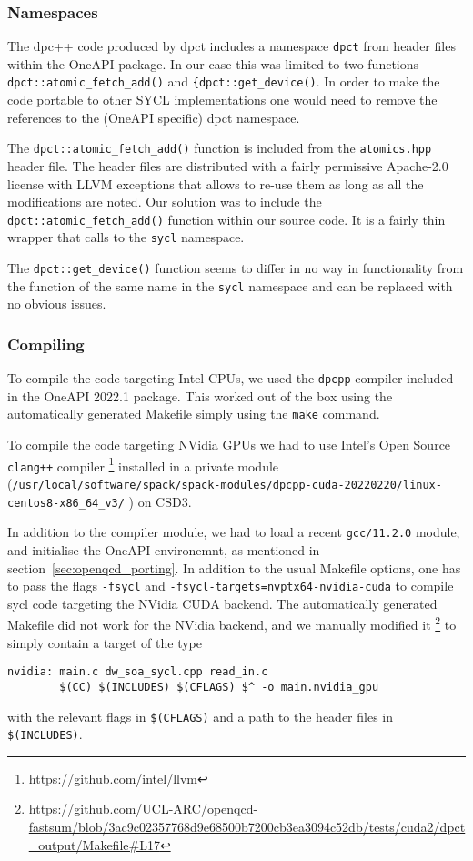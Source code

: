 \subsubsection{Namespaces}\label{sec:openqcd_namespaces}

The dpc++ code produced by dpct includes a namespace \texttt{dpct} from header files within the OneAPI package. In our case this was limited to two functions \verb!dpct::atomic_fetch_add()! and \verb!{dpct::get_device()!. In order to make the code portable to other SYCL implementations one would need to remove the references to the (OneAPI specific) dpct namespace.

The \verb!dpct::atomic_fetch_add()! function is included from the \texttt{atomics.hpp} header file. The header files are distributed with a fairly permissive Apache-2.0 license with LLVM exceptions that allows to re-use them as long as all the modifications are noted. Our solution was to include the \verb!dpct::atomic_fetch_add()! function within our source code. It is a fairly thin wrapper that calls to the \texttt{sycl} namespace.

The \verb!dpct::get_device()! function seems to differ in no way in functionality from the function of the same name in the \texttt{sycl} namespace and can be replaced with no obvious issues. 

\subsubsection{Compiling}\label{sec:openqcd_compiling}

To compile the code targeting Intel CPUs, we used the \texttt{dpcpp} compiler included in the OneAPI 2022.1 package. This worked out of the box using the automatically generated Makefile simply using the \texttt{make} command.

To compile the code targeting NVidia GPUs we had to use Intel's Open Source \verb #clang++# compiler \footnote{\url{https://github.com/intel/llvm}}
installed in a private module (\verb #/usr/local/software/spack/spack-modules/dpcpp-cuda-20220220/linux-centos8-x86_64_v3/# ) on CSD3.

In addition to the compiler module, we had to load a recent \verb #gcc/11.2.0# module, and initialise the OneAPI environemnt, as mentioned in section~\ref{sec:openqcd_porting}. In addition to the usual Makefile options, one has to pass the flags \verb #-fsycl# and \verb #-fsycl-targets=nvptx64-nvidia-cuda# to compile sycl code targeting the NVidia CUDA backend. The automatically generated Makefile did not work for the NVidia backend, and we manually modified it \footnote{\url{https://github.com/UCL-ARC/openqcd-fastsum/blob/3ac9c02357768d9e68500b7200cb3ea3094c52db/tests/cuda2/dpct_output/Makefile\#L17}} to simply contain a target of the type
\begin{verbatim}
nvidia: main.c dw_soa_sycl.cpp read_in.c
        $(CC) $(INCLUDES) $(CFLAGS) $^ -o main.nvidia_gpu
\end{verbatim}
with the relevant flags in \verb #$(CFLAGS)# and a path to the header files in \verb #$(INCLUDES)#.


